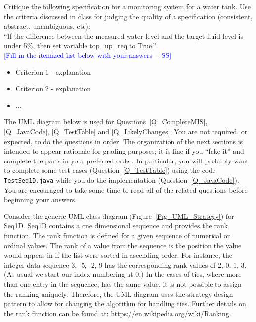 \documentclass[12pt,fleqn]{examtst}
\newcommand{\authornote}[3]{\textcolor{#1}{[#3 ---#2]}}
\newcommand{\authornote}[3]{}
\newcommand{\wss}[1]{\authornote{blue}{SS}{#1}}
\begin{document}

\newpage

\noindent
\begin{minipage}{\textwidth}

Critique the following specification for a monitoring system for a water tank.
Use the criteria discussed in class for judging the quality of a specification
(consistent, abstract, unambiguous, etc):\\

``If the difference between the measured water level and the target fluid level is
under 5\%, then set variable top\_up\_req to True.''
~\\

\noindent \wss{Fill in the itemized list below with your answers}

\begin{itemize}
\item Criterion 1 - explanation
\item Criterion 2 - explanation
\item ...
\end{itemize}

\end{minipage}


\newpage

\noindent The UML diagram below is used for Questions~\ref{Q_CompleteMIS},
\ref{Q_JavaCode}, \ref{Q_TestTable} and \ref{Q_LikelyChanges}.  You are not
required, or expected, to do the questions in order.  The organization of the
next sections is intended to appear rationale for grading purposes; it is fine
if you ``fake it'' and complete the parts in your preferred order.  In
particular, you will probably want to complete some test cases
(Question~\ref{Q_TestTable}) using the code \texttt{TestSeq1D.java} while you do
the implementation (Question~\ref{Q_JavaCode}).  You are encouraged to take some
time to read all of the related questions before beginning your answers.

Consider the generic UML class diagram (Figure~\ref{Fig_UML_Strategy}) for
Seq1D.  Seq1D contains a one dimensional sequence and provides the rank
function.  The rank function is defined for a given sequence of numerical or
ordinal values.  The rank of a value from the sequence is the position the value
would appear in if the list were sorted in ascending order.  For instance, the
integer data sequence 3, -5, -2, 9 has the corresponding rank values of 2, 0, 1,
3.  (As usual we start our index numbering at 0.)  In the cases of ties, where
more than one entry in the sequence, has the same value, it is not possible to
assign the ranking uniquely.  Therefore, the UML diagram uses the strategy
design pattern to allow for changing the algorithm for handling ties.  Further
details on the rank function can be found at:
\url{https://en.wikipedia.org/wiki/Ranking}.
\end{document}
